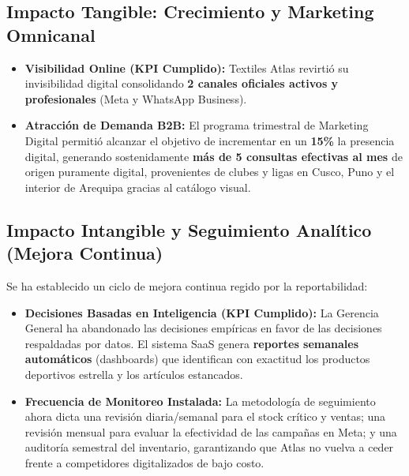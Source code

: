\subsection{Impacto Tangible: Crecimiento y Marketing Omnicanal}
\begin{itemize}
    \item \textbf{Visibilidad Online (KPI Cumplido):} Textiles Atlas revirtió su invisibilidad digital consolidando \textbf{2 canales oficiales activos y profesionales} (Meta y WhatsApp Business). 
    \item \textbf{Atracción de Demanda B2B:} El programa trimestral de Marketing Digital permitió alcanzar el objetivo de incrementar en un \textbf{15\%} la presencia digital, generando sostenidamente \textbf{más de 5 consultas efectivas al mes} de origen puramente digital, provenientes de clubes y ligas en Cusco, Puno y el interior de Arequipa gracias al catálogo visual.
\end{itemize}

\subsection{Impacto Intangible y Seguimiento Analítico (Mejora Continua)}
Se ha establecido un ciclo de mejora continua regido por la reportabilidad:
\begin{itemize}
    \item \textbf{Decisiones Basadas en Inteligencia (KPI Cumplido):} La Gerencia General ha abandonado las decisiones empíricas en favor de las decisiones respaldadas por datos. El sistema SaaS genera \textbf{reportes semanales automáticos} (dashboards) que identifican con exactitud los productos deportivos estrella y los artículos estancados.
    \item \textbf{Frecuencia de Monitoreo Instalada:} La metodología de seguimiento ahora dicta una revisión diaria/semanal para el stock crítico y ventas; una revisión mensual para evaluar la efectividad de las campañas en Meta; y una auditoría semestral del inventario, garantizando que Atlas no vuelva a ceder frente a competidores digitalizados de bajo costo.
\end{itemize}
